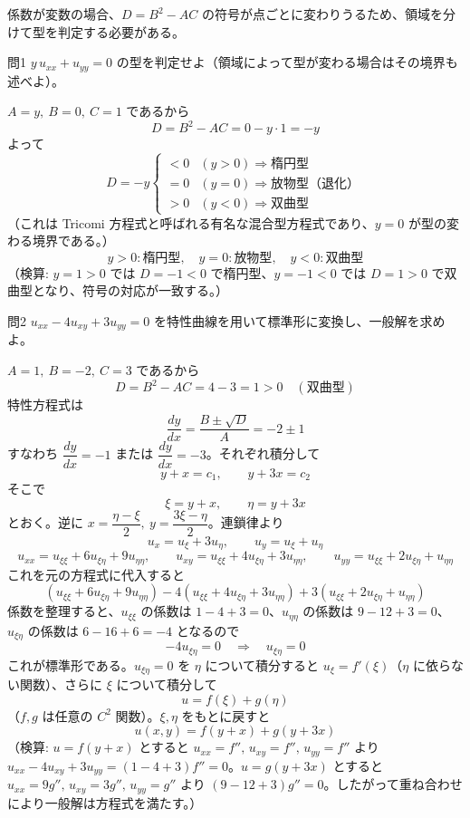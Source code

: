 \documentclass[a4paper,11pt]{article}
\begin{document}
\medskip
\noindent
係数が変数の場合、$D=B^2-AC$ の符号が点ごとに変わりうるため、領域を分けて型を判定する必要がある。

\clearpage
\begin{mondaiboxS}{問1}
$y\,u_{xx} + u_{yy} = 0$ の型を判定せよ（領域によって型が変わる場合はその境界も述べよ）。
\end{mondaiboxS}
\kaitou
$A=y,\ B=0,\ C=1$ であるから
\[
D = B^{2}-AC = 0 - y\cdot 1 = -y
\]
よって
\[
D = -y
\begin{cases}
<0 & (y>0) \Rightarrow \text{楕円型}\\
=0 & (y=0) \Rightarrow \text{放物型（退化）}\\
>0 & (y<0) \Rightarrow \text{双曲型}
\end{cases}
\]
（これは Tricomi 方程式と呼ばれる有名な混合型方程式であり、$y=0$ が型の変わる境界である。）
\[
\boxed{\; y>0:\text{楕円型},\quad y=0:\text{放物型},\quad y<0:\text{双曲型}\;}
\]
（検算: $y=1>0$ では $D=-1<0$ で楕円型、$y=-1<0$ では $D=1>0$ で双曲型となり、符号の対応が一致する。）

\clearpage
\begin{mondaiboxS}{問2}
$u_{xx} - 4u_{xy} + 3u_{yy} = 0$ を特性曲線を用いて標準形に変換し、一般解を求めよ。
\end{mondaiboxS}
\kaitou
$A=1,\ B=-2,\ C=3$ であるから
\[
D = B^{2}-AC = 4 - 3 = 1 > 0 \quad (\text{双曲型})
\]
特性方程式は
\[
\frac{dy}{dx} = \frac{B \pm \sqrt{D}}{A} = -2 \pm 1
\]
すなわち $\dfrac{dy}{dx} = -1$ または $\dfrac{dy}{dx} = -3$。それぞれ積分して
\[
y + x = c_1, \qquad y + 3x = c_2
\]
そこで
\[
\xi = y + x, \qquad \eta = y + 3x
\]
とおく。逆に $x = \dfrac{\eta-\xi}{2},\ y = \dfrac{3\xi-\eta}{2}$。連鎖律より
\[
u_x = u_\xi + 3u_\eta, \qquad u_y = u_\xi + u_\eta
\]
\[
u_{xx} = u_{\xi\xi} + 6u_{\xi\eta} + 9u_{\eta\eta}, \qquad
u_{xy} = u_{\xi\xi} + 4u_{\xi\eta} + 3u_{\eta\eta}, \qquad
u_{yy} = u_{\xi\xi} + 2u_{\xi\eta} + u_{\eta\eta}
\]
これを元の方程式に代入すると
\[
(u_{\xi\xi}+6u_{\xi\eta}+9u_{\eta\eta}) - 4(u_{\xi\xi}+4u_{\xi\eta}+3u_{\eta\eta}) + 3(u_{\xi\xi}+2u_{\xi\eta}+u_{\eta\eta})
\]
係数を整理すると、$u_{\xi\xi}$ の係数は $1-4+3=0$、$u_{\eta\eta}$ の係数は $9-12+3=0$、$u_{\xi\eta}$ の係数は $6-16+6=-4$ となるので
\[
-4u_{\xi\eta} = 0 \quad\Longrightarrow\quad u_{\xi\eta}=0
\]
これが標準形である。$u_{\xi\eta}=0$ を $\eta$ について積分すると $u_\xi = f'(\xi)$（$\eta$ に依らない関数）、さらに $\xi$ について積分して
\[
u = f(\xi) + g(\eta)
\]
（$f,g$ は任意の $C^2$ 関数）。$\xi,\eta$ をもとに戻すと
\[
\boxed{\; u(x,y) = f(y+x) + g(y+3x) \;}
\]
（検算: $u=f(y+x)$ とすると $u_{xx}=f'',\,u_{xy}=f'',\,u_{yy}=f''$ より $u_{xx}-4u_{xy}+3u_{yy}=(1-4+3)f''=0$。$u=g(y+3x)$ とすると $u_{xx}=9g'',\,u_{xy}=3g'',\,u_{yy}=g''$ より $(9-12+3)g''=0$。したがって重ね合わせにより一般解は方程式を満たす。）
\end{document}
